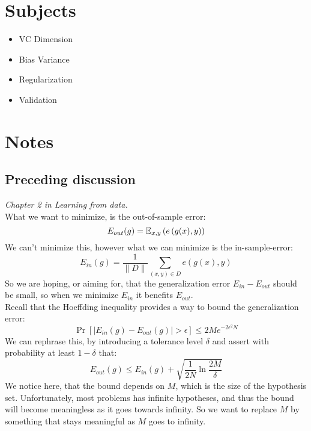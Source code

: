 


    \section{Subjects}
    \begin{itemize}
        \item VC Dimension
        \item Bias Variance
        \item Regularization
        \item Validation
    \end{itemize}
    \section{Notes}
    
    \subsection{Preceding discussion}
    \textit{Chapter 2 in Learning from data.}\\
    What we want to minimize, is the out-of-sample error:
    \begin{equation*}
    E_{out}(g) = \mathbb{E}_{x,y}\left(e\left(g(x), y\right)\right)
    \end{equation*}
    We can't minimize this, however what we can minimize is the in-sample-error:
    \begin{equation*}
    E_{in}(g)=\frac{1}{\|D\|} \sum_{(x,y) \in D} e\left(g(x), y\right)
    \end{equation*}
    So we are hoping, or aiming for, that the generalization error 
    $E_{in}-E_{out}$ should be small, so when we minimize $E_{in}$ it benefits 
    $E_{out}$.\\
    Recall that the Hoeffding inequality provides a way to bound the 
    generalization error:
    \begin{equation*}
    \Pr[|E_{in}(g) - E_{out}(g)| > \epsilon] \leq 2Me^{-2\epsilon^2N}
    \end{equation*}
    We can rephrase this, by introducing a tolerance level $\delta$ and assert 
    with probability at least $1 - \delta$ that: 
    \begin{equation*}
    E_{out}(g) \leq E_{in}(g) + \sqrt{\frac{1}{2N}\ln\frac{2M}{\delta}}
    \end{equation*}
    We notice here, that the bound depends on $M$, which is the size of the 
    hypothesis set. Unfortunately, most problems has infinite hypotheses, and 
    thus the bound will become meaningless as it goes towards infinity. So we 
    want to replace $M$ by something that stays meaningful as $M$ goes to 
    infinity. 
    

